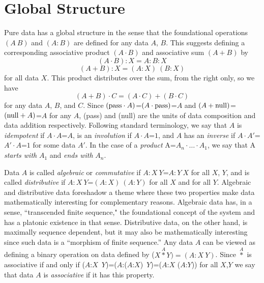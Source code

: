 \documentclass[11pt]{article}
\begin{document}
\section{Global Structure} 

    Pure data has a global structure in the sense that the foundational operations $(A\ B)$ and $(A:B)$ are defined for any data $A$, $B$.  
This suggests defining a corresponding associative product $(A\cdot B)$ and associative sum $(A+B)$ by    
\begin{equation}
(A \cdot B):X = A:B:X 
\end{equation}
\begin{equation}
(A+B):X = (A:X)\ (B:X) 
\end{equation}
for all data $X$. This product distributes over the sum, from the right only, so we have 
\begin{equation}
(A+B)\cdot C=(A\cdot C)+(B\cdot C) 
\end{equation}
for any data $A$, $B$, and $C$.
Since $({\rm pass}\cdot A)$=$(A\cdot {\rm pass})$=$A$ and $(A+{\rm null})$=$({\rm null}+A)$=$A$ for any $A$, (pass) and (null) are the units of data composition and 
data addition respectively.  
Following standard terminology, we say that $A$ is {\it idempotent} if $A\cdot A$=$A$, is an {\it involution} if $A\cdot A$=$1$, and $A$ has an {\it inverse} if $A\cdot A'$=$A'\cdot A$=$1$ for some data $A'$.   
In the case of a {\it product}  A=$A_n\cdot\dots\cdot A_1$, we say that A {\it starts with} $A_1$ and {\it ends with} $A_n$.   

Data $A$ is called {\it algebraic} or {\it commutative} if $A:X\ Y$=$A:Y\ X$ for all $X$, $Y$, and is called 
{\it distributive} if $A:X\ Y$=$(A:X)\ (A:Y)$ for all $X$ and for all $Y$.  
Algebraic and distributive data foreshadow a theme where these two properties make data mathematically interesting for complementary reasons.  
Algebraic data has, in a sense, ``transcended finite sequence," the foundational concept of the system and has a platonic existence in 
that sense.  Distributive data, on the other hand, is maximally sequence dependent, but it may also be mathematically interesting since 
such data is a ``morphism of finite sequence.''   
Any data $A$ can be viewed as defining a binary operation on data defined by ($X{\overset A\ast}Y)=(A:X\ Y)$.  Since ${\overset A\ast}$ is associative if and only if 
 ($A$:$X$\ $Y$)=($A$:($A$:$X$)\ $Y$)=($A$:$X$ ($A$:$Y$)) for all $X$,$Y$ we say that data $A$ is {\it associative} if it has this property.  
 
\end{document}
